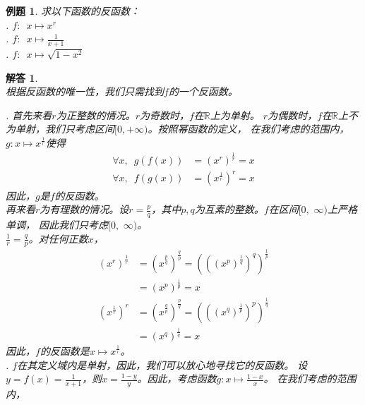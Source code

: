 \documentclass[12pt,UTF8]{ctexbook}
\newtheorem{et}{例题}[section]
\newtheorem*{so}{解答}
\begin{document}
\begin{et}\label{et:1-3-0}
    求以下函数的反函数：\\
    . $f:\,\,\,x \mapsto x^r$\\
    . $f:\,\,\,x \mapsto \frac{1}{x + 1}$\\
    . $f:\,\,\,x \mapsto \sqrt{1 - x^2}$
\end{et}
\begin{so}
    \mbox{} \\
    根据反函数的唯一性，我们只需找到$f$的一个反函数。

    . 首先来看$r$为正整数的情况。$r$为奇数时，$f$在$\mathbb{R}$上为单射。
    $r$为偶数时，$f$在$\mathbb{R}$上不为单射，我们只考虑区间$[0, +\infty)$。按照幂函数的定义，
    在我们考虑的范围内，$g: x\mapsto x^{\frac{1}{r}}$使得
    \begin{align*}
        \forall x, \,\,\, g(f(x)) &= \left(x^r\right)^{\frac{1}{r}} = x  \\
        \forall x, \,\,\, f(g(x)) &= \left(x^{\frac{1}{r}}\right)^{r} = x  
    \end{align*} 
    因此，$g$是$f$的反函数。\\  
    再来看$r$为有理数的情况。设$r = \frac{p}{q}$，其中$p,q$为互素的整数。$f$在区间$[0,\,\,\infty)$上严格单调，
    因此我们只考虑$[0,\,\,\infty)$。\\
    $\frac{1}{r} = \frac{q}{p}$。对任何正数$x$，
    \begin{align*}
        \left(x^r\right)^{\frac{1}{r}} &= \left(x^{\frac{p}{q}}\right)^{\frac{q}{p}} = \left(\left(\left(x^{p}\right)^\frac{1}{q}\right)^q\right)^\frac{1}{p}  \\
                                       &= \left(x^{p}\right)^\frac{1}{p} = x 
    \end{align*}
    \begin{align*}
        \left(x^{\frac{1}{r}}\right)^r &= \left(x^{\frac{q}{p}}\right)^{\frac{p}{q}} = \left(\left(\left(x^{q}\right)^\frac{1}{p}\right)^p\right)^\frac{1}{q}  \\
                                       &= \left(x^{q}\right)^\frac{1}{q} = x 
    \end{align*}
    因此，$f$的反函数是$x\mapsto x^{\frac{1}{r}}$。\\
    . $f$在其定义域内是单射，因此，我们可以放心地寻找它的反函数。
    设$y = f(x) = \frac{1}{x+1}$，则$x = \frac{1 - y}{y}$。因此，考虑函数$g: x\mapsto \frac{1 - x}{x}$。
    在我们考虑的范围内，
    \begin{align*}

\end{align*}
\end{so}
\end{document}
